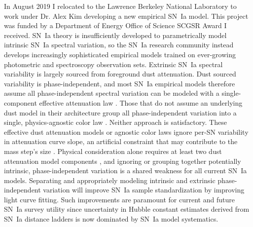 \documentclass[modern]{aastex631}
\begin{document}
In August 2019 I relocated to the Lawrence Berkeley National Laboratory to work under Dr. Alex Kim developing a new empirical SN~Ia model. 
This project was funded by a Department of Energy Office of Science SCGSR Award I received. 
SN~Ia theory is insufficiently developed to parametrically model intrinsic SN~Ia spectral variation, so the SN~Ia research community instead develops increasingly sophisticated empirical models trained on ever-growing photometric and spectroscopy observation sets. 
Extrinsic SN~Ia spectral variability is largely sourced from foreground dust attenuation.  
Dust sourced variability is phase-independent, and most SN~Ia empirical models therefore assume all phase-independent spectral variation can be modeled with a single-component effective attenuation law \citep{Jha2007,Burns2011,Mandel2022}. 
Those that do not assume an underlying dust model in their architecture group all phase-independent variation into a single, physics-agnostic color law \citep{Guy2007,Kenworthy2021}. 
Neither approach is satisfactory. 
These effective dust attenuation models or agnostic color laws ignore per-SN variability in attenuation curve slope, an artificial constraint that may contribute to the mass step's size \citep{Brout2019,Popovic2021}. 
Physical consideration alone requires at least two dust attenuation model components \citep{Weingartner2001}, and ignoring or grouping together potentially intrinsic, phase-independent variation is a shared weakness for all current SN~Ia models. 
Separating and appropriately modeling intrinsic and extrinsic phase-independent variation will improve SN~Ia sample standardization by improving light curve fitting. 
Such improvements are paramount for current and future SN~Ia survey utility since uncertainty in Hubble constant estimates derived from SN~Ia distance ladders is now dominated by SN~Ia model systematics. 
\end{document}
